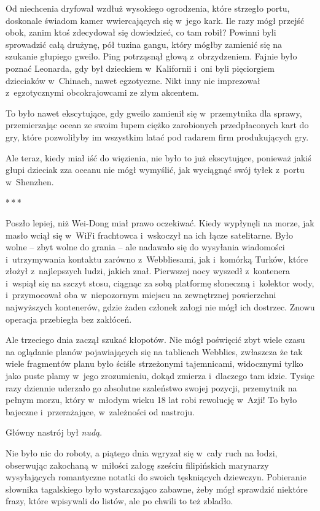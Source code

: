 \documentclass[oneside,polish,11pt,rmheadings]{mwbk}
\newcommand{\threeast}{\par\centerline{*\,*\,*}\medskip\par}
\begin{document}
Od niechcenia dryfował wzdłuż wysokiego ogrodzenia, które strzegło portu, doskonale świadom kamer wwiercających się w~jego kark. Ile razy mógł przejść obok, zanim ktoś zdecydował się dowiedzieć, co tam robił? Powinni byli sprowadzić całą drużynę, pół tuzina gangu, który mógłby zamienić się na szukanie głupiego gweilo. Ping potrząsnął głową z~obrzydzeniem. Fajnie było poznać Leonarda, gdy był dzieckiem w~Kalifornii i~oni byli pięciorgiem dzieciaków w~Chinach, nawet egzotyczne. Nikt inny nie imprezował z~egzotycznymi obcokrajowcami ze złym akcentem.

To było nawet ekscytujące, gdy gweilo zamienił się w~przemytnika dla sprawy, przemierzając ocean ze swoim łupem ciężko zarobionych przedpłaconych kart do gry, które pozwoliłyby im wszystkim latać pod radarem firm produkujących gry.

Ale teraz, kiedy miał iść do więzienia, nie było to już ekscytujące, ponieważ jakiś głupi dzieciak zza oceanu nie mógł wymyślić, jak wyciągnąć swój tyłek z~portu w~Shenzhen.

\bigskip
\threeast

Poszło lepiej, niż Wei-Dong miał prawo oczekiwać. Kiedy wypłynęli na morze, jak masło wciął się w~WiFi frachtowca i~wskoczył na ich łącze satelitarne. Było wolne -- zbyt wolne do grania -- ale nadawało się do wysyłania wiadomości i~utrzymywania kontaktu zarówno z~Webbliesami, jak i~komórką Turków, które złożył z~najlepszych ludzi, jakich znał. Pierwszej nocy wyszedł z~kontenera i~wspiął się na szczyt stosu, ciągnąc za sobą platformę słoneczną i~kolektor wody, i~przymocował oba w~niepozornym miejscu na zewnętrznej powierzchni najwyższych kontenerów, gdzie żaden członek załogi nie mógł ich dostrzec. Znowu operacja przebiegła bez zakłóceń.

Ale trzeciego dnia zaczął szukać kłopotów. Nie mógł poświęcić zbyt wiele czasu na oglądanie planów pojawiających się na tablicach Webblies, zwłaszcza że tak wiele fragmentów planu było ściśle strzeżonymi tajemnicami, widocznymi tylko jako puste plamy w~jego zrozumieniu, dokąd zmierza i~dlaczego tam idzie. Tysiąc razy dziennie uderzało go absolutne szaleństwo swojej pozycji, przemytnik na pełnym morzu, który w~młodym wieku 18 lat robi rewolucję w~Azji! To było bajeczne i~przerażające, w~zależności od nastroju.

Główny nastrój był \textit{nudą}.

Nie było nic do roboty, a piątego dnia wgryzał się w~cały ruch na łodzi, obserwując zakochaną w~miłości załogę sześciu filipińskich marynarzy wysyłających romantyczne notatki do swoich tęskniących dziewczyn. Pobieranie słownika tagalskiego było wystarczająco zabawne, żeby mógł sprawdzić niektóre frazy, które wpisywali do listów, ale po chwili to też zbladło.
\end{document}
